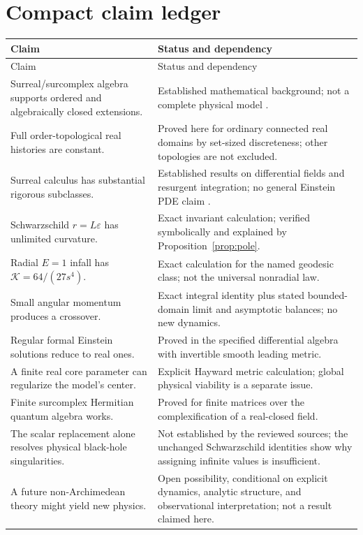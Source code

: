 \documentclass[11pt,letterpaper]{article}
\newcommand{\eps}{\varepsilon}
\newcommand{\Kretsch}{\mathcal K}
\theoremstyle{definition}
\theoremstyle{remark}
\begin{document}
\section{Compact claim ledger}
\label{app:ledger}

\begin{longtable}{@{}P{0.43\textwidth}P{0.46\textwidth}@{}}
\toprule
Claim & Status and dependency \\
\midrule
\endfirsthead
\toprule
Claim & Status and dependency \\
\midrule
\endhead
Surreal/surcomplex algebra supports ordered and algebraically closed
extensions. & Established mathematical background; not a complete physical
model \cite{Conway,Gonshor}. \\
Full order-topological real histories are constant. & Proved here for ordinary
connected real domains by set-sized discreteness; other topologies are not
excluded. \\
Surreal calculus has substantial rigorous subclasses. & Established results
on differential fields and resurgent integration; no general Einstein PDE
claim \cite{BerarducciMantova,ADH,CostinEhrlich}. \\
Schwarzschild $r=L\eps$ has unlimited curvature. & Exact invariant calculation;
verified symbolically and explained by Proposition~\ref{prop:pole}. \\
Radial $E=1$ infall has $\Kretsch=64/(27s^4)$. & Exact calculation for the named
geodesic class; not the universal nonradial law. \\
Small angular momentum produces a crossover. & Exact integral identity plus
stated bounded-domain limit and asymptotic balances; no new dynamics. \\
Regular formal Einstein solutions reduce to real ones. & Proved in the
specified differential algebra with invertible smooth leading metric. \\
A finite real core parameter can regularize the model's center. & Explicit
Hayward metric calculation; global physical viability is a separate issue. \\
Finite surcomplex Hermitian quantum algebra works. & Proved for finite matrices
over the complexification of a real-closed field. \\
The scalar replacement alone resolves physical black-hole singularities. & Not
established by the reviewed sources; the unchanged Schwarzschild identities
show why assigning infinite values is insufficient. \\
A future non-Archimedean theory might yield new physics. & Open possibility,
conditional on explicit dynamics, analytic structure, and observational
interpretation; not a result claimed here. \\
\bottomrule
\end{longtable}
\end{document}
